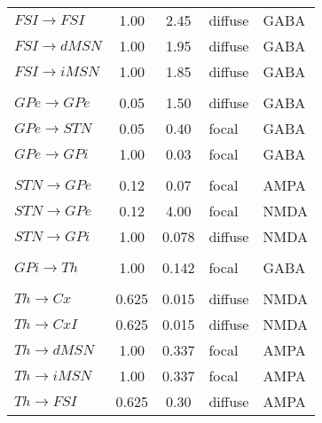 \begin{table}[h!]
\begin{tabular}{l | ccll}
$FSI \rightarrow FSI$   &     1.00  &   2.45    & diffuse  & GABA       \\
$FSI \rightarrow dMSN$  &     1.00  &   1.95    & diffuse  & GABA       \\
$FSI \rightarrow iMSN$  &     1.00  &   1.85    & diffuse  & GABA       \\ [1ex] \hline \\ [-1.5ex]

$GPe \rightarrow GPe$   &     0.05  &   1.50    & diffuse  & GABA       \\
$GPe \rightarrow STN$   &     0.05  &   0.40    & focal    & GABA       \\
$GPe \rightarrow GPi$   &     1.00  &   0.03    & focal    & GABA       \\ [1ex] \hline \\ [-1.5ex]

$STN \rightarrow GPe$   &     0.12  &   0.07    & focal    & AMPA       \\
$STN \rightarrow GPe$   &     0.12  &   4.00    & focal    & NMDA       \\
$STN \rightarrow GPi$   &     1.00  &   0.078   & diffuse  & NMDA       \\ [1ex] \hline \\ [-1.5ex]

$GPi \rightarrow Th$    &     1.00  &   0.142   & focal    & GABA       \\ [1ex] \hline \\ [-1.5ex]

$Th \rightarrow Cx$     &     0.625 &   0.015   & diffuse  & NMDA       \\
$Th \rightarrow CxI$    &     0.625 &   0.015   & diffuse  & NMDA       \\
$Th \rightarrow dMSN$   &     1.00  &   0.337   & focal    & AMPA       \\
$Th \rightarrow iMSN$   &     1.00  &   0.337   & focal    & AMPA       \\
$Th \rightarrow FSI$    &     0.625 &   0.30    & diffuse  & AMPA       \\
\end{tabular}
\end{table}
